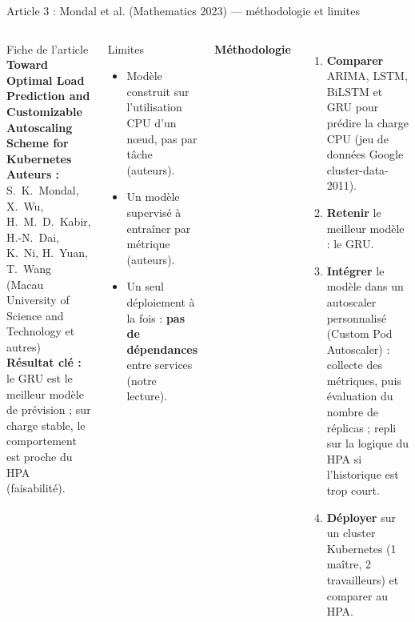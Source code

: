 \documentclass[aspectratio=169,10pt]{beamer}
\begin{document}
\begin{frame}{Article 3 : Mondal et al. (Mathematics 2023) --- méthodologie et limites}
  \begin{columns}[T]
    \begin{block}{Fiche de l'article}
      \scriptsize
      \textbf{Toward Optimal Load Prediction and Customizable Autoscaling Scheme for Kubernetes}\\[2pt]
      \textbf{Auteurs :} S.~K.~Mondal, X.~Wu, H.~M.~D.~Kabir, H.-N.~Dai, K.~Ni, H.~Yuan, T.~Wang (Macau University of Science and Technology et autres)\\[2pt]
      \textbf{Résultat clé :} le GRU est le meilleur modèle de prévision ; sur charge stable, le comportement est proche du HPA (faisabilité).
    \end{block}
    \begin{alertblock}{Limites}
      \scriptsize
      \begin{itemize}
        \item Modèle construit sur l'utilisation CPU d'un nœud, pas par tâche (auteurs).
        \item Un modèle supervisé à entraîner par métrique (auteurs).
        \item Un seul déploiement à la fois : \textbf{pas de dépendances} entre services (notre lecture).
      \end{itemize}
    \end{alertblock}

    \textbf{Méthodologie}
    \small
    \begin{enumerate}
      \item \textbf{Comparer} ARIMA, LSTM, BiLSTM et GRU pour prédire la charge CPU (jeu de données Google cluster-data-2011).
      \item \textbf{Retenir} le meilleur modèle : le GRU.
      \item \textbf{Intégrer} le modèle dans un autoscaler personnalisé (Custom Pod Autoscaler) : collecte des métriques, puis évaluation du nombre de réplicas ; repli sur la logique du HPA si l'historique est trop court.
      \item \textbf{Déployer} sur un cluster Kubernetes (1 maître, 2 travailleurs) et comparer au HPA.
    \end{enumerate}
  \end{columns}
\end{frame}
\end{document}

